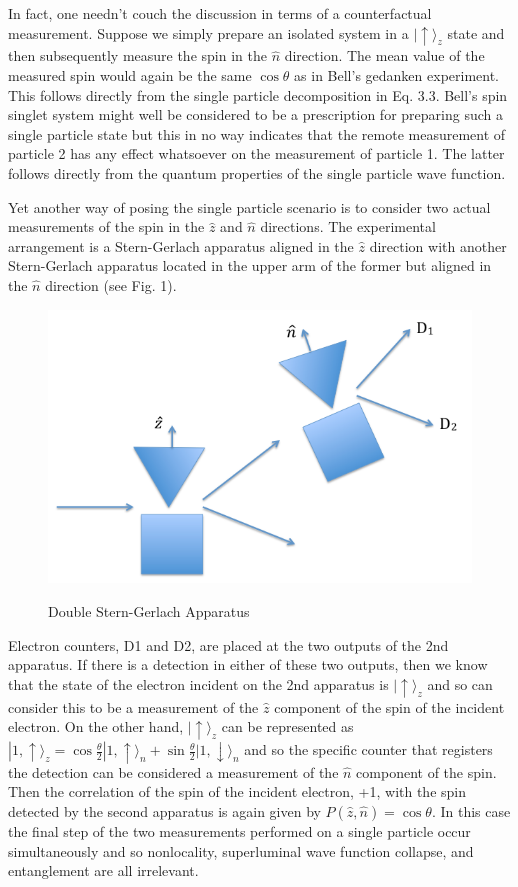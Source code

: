 \documentclass[12pt]{article}
\begin{document}
In fact, one needn't couch the discussion in terms of a counterfactual measurement.  Suppose we simply prepare an isolated system in a $|\uparrow\rangle_z$ state and then subsequently measure the spin in the $\hat{n}$ direction.  The mean value of the measured spin would again be the same $\cos{\theta}$ as in Bell's gedanken experiment.  This follows directly from the single particle decomposition in Eq. 3.3.  Bell's spin singlet system might well be considered to be a prescription for preparing such a single particle state but this in no way indicates that the remote measurement of particle 2 has any effect whatsoever on the measurement of particle 1.  The latter follows directly from the quantum properties of the single particle wave function.

Yet another way of posing the single particle scenario is to consider two actual measurements of the spin in the $\hat{z}$ and $\hat{n}$ directions.  The experimental arrangement is a Stern-Gerlach apparatus aligned in the $\hat{z}$ direction with another Stern-Gerlach apparatus located in the upper arm of the former but aligned in the $\hat{n}$ direction (see Fig. 1). 
\begin{figure}[htb]
\vbox{\hfil\scalebox{1.0}
{\includegraphics{Stern-Gerlach.pdf}}\hfil}
{\caption{\footnotesize{Double Stern-Gerlach Apparatus}}}
\end{figure}
Electron counters, D1 and D2, are placed at the two outputs of the 2nd apparatus.    If there is a detection in either of these two outputs, then we know that the state of the electron incident on the 2nd apparatus is $|\uparrow \rangle_z$ and so can consider this to be a measurement of the $\hat{z}$ component of the spin of the incident electron.  On the other hand, $|\uparrow \rangle_z$ can be represented as $|1,\uparrow \rangle_z = \cos{\frac{\theta}{2}} |1,\uparrow \rangle_n + \sin{\frac{\theta}{2}} |1,\downarrow \rangle_n$ and so the specific counter that registers the detection can be considered a measurement of the $\hat{n}$ component of the spin.  Then the correlation of the spin of the incident electron, +1, with the spin detected by the second apparatus is again given by $P(\hat{z},\hat{n})=\cos \theta$.  In this case the final step of the two measurements performed on a single particle occur simultaneously and so nonlocality, superluminal wave function collapse, and entanglement are all irrelevant.
\end{document}

